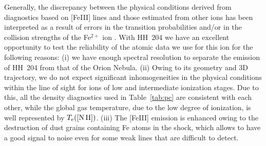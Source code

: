 \documentclass[twocolumn,linenumbers]{aastex63}
\begin{document}
Generally, the discrepancy between the physical conditions derived from diagnostics based on [Fe\thinspace III] lines and those estimated from other ions has been interpreted as a result of errors in the transition probabilities and/or in the collision strengths of the Fe$^{2+}$ ion \citep[See the introduction of][]{laha17}. With HH~204 we have an excellent opportunity to test the reliability of the atomic data we use for this ion for the following reasons: (i) we have enough spectral resolution to separate the emission of HH~204 from that of the Orion Nebula. (ii) Owing to its geometry and 3D trajectory, we do not expect significant inhomogeneities in the physical conditions within the line of sight for ions of low and intermediate ionization stages. Due to this, all the density diagnostics used in Table~\ref{tab:pc} are consistent with each other, while the global gas temperature, due to the low degree of ionization, is well represented by $T_{\rm e}(\text{[N\thinspace II]})$. (iii) The [Fe\thinspace III] emission is enhanced owing to the destruction of dust grains containing Fe atoms in the shock, which allows to have a good signal to noise even for some weak lines that are difficult to detect. 
\end{document}
